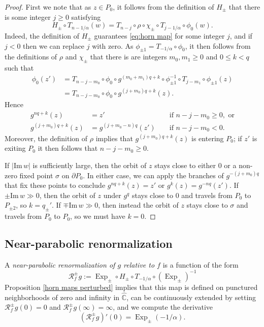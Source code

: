 \documentclass[12pt,letterpaper]{amsart}
\numberwithin{equation}{section}
\theoremstyle{remark}
\theoremstyle{definition}
\DeclareMathOperator{\Exp}{Exp}
\begin{document}
	\begin{proof}
		First we note that as $z\in P_0$, it follows from the definition of $H_\pm$ that there is some integer $j\geq 0$ satisfying
		\begin{equation}\label{eq:horn map}
			H_\pm\circ T_{n-1/\alpha}(w) = T_{n-j}\circ \rho \circ \chi_\pm\circ T_{j- 1/\alpha}\circ \phi_{0}(w).
		\end{equation}
		Indeed, the definition of $H_\pm$ guarantees \eqref{eq:horn map} for some integer $j$, and if $j< 0$ then we can replace $j$ with zero.		
		As $\phi_{\pm 1} = T_{-1/\alpha}\circ \phi_0$, it then follows from the definitions of $\rho$ and $\chi_\pm$ that there is are integers $m_0, m_1\geq 0$ and $0\leq k < q$ such that 
		\begin{align*}
			\phi_0(z') &=T_{n-j-m_0}\circ \phi_0\circ g^{(m_0+m_1)q+k} \circ  \phi_{\pm 1}^{-1}\circ T_{j-m_1}\circ \phi_{\pm 1}(z)\\
			&= T_{n-j-m_0}\circ \phi_0\circ g^{(j+m_0)q+k}(z).
		\end{align*}
		Hence \begin{align*}
			g^{nq+k}(z) &= z'&&\text{ if }n-j-m_0\geq 0, \text{ or}\\
			g^{(j+m_0)q+k}(z) &= g^{(j+m_0-n)q}(z') &&\text{ if }n-j-m_0< 0.
		\end{align*}
		Moreover, the definition of $\rho$ implies that $g^{(j+m_0)q+k}(z)$ is entering $P_0$; if $z'$ is exiting $P_0$ it then follows that $n-j-m_0\geq 0$.
		
		If $|\text{Im}\, w|$ is sufficiently large, then the orbit of $z$ stays close to either $0$ or a non-zero fixed point $\sigma$ on $\partial P_0$. In either case, we can apply the branches of $g^{-(j+m_0)q}$ that fix these points to conclude $g^{nq+k}(z) = z'$ or $g^{k}(z) = g^{-nq}(z')$.
		If  $\pm \text{Im}\,w\gg 0$, 
		then the orbit of $z$ under $g^q$ stays close to $0$ and travels 
		from $P_0$ to $P_{\pm 2}$, so $k = q_\pm'$.
		If $\mp\text{Im}\,w\gg 0$, then instead the orbit of $z$ stays close to $\sigma$ and travels from $P_0$ to $P_0$, so we must have $k = 0$. 
	\end{proof}
	

	\subsection{Near-parabolic renormalization}

	A \textit{near-parabolic renormalization of $g$ relative to $f$} is a function of the form
	$$\mathcal{R}_f^\pm g:=\Exp_\pm \circ  H_\pm\circ T_{-1/\alpha}\circ(\Exp_\pm)^{-1}$$
	Proposition \ref{horn maps perturbed} implies that this map is defined on punctured neighborhoods of zero and infinity in $\hat{\mathbb{C}}$,  can be continuously extended by setting
	$\mathcal{R}_f^\pm g(0) = 0$ and $\mathcal{R}_f^\pm g(\infty) = \infty$, and we  compute the derivative  $$(\mathcal{R}_f^\pm g)'(0) = \Exp_\pm(-1/\alpha).$$
	
\end{document}
